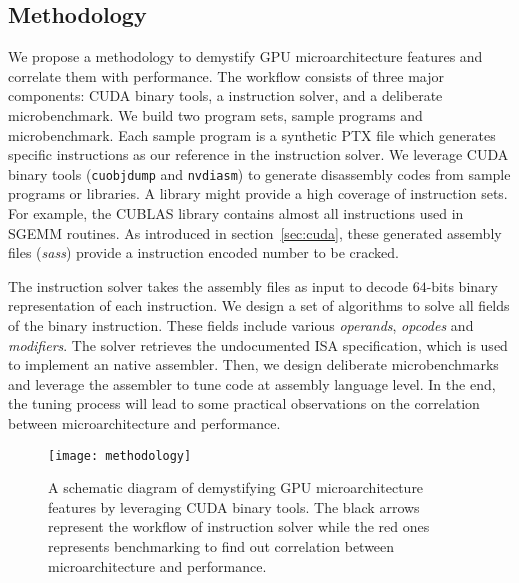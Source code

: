 \subsection{Methodology}

We propose a methodology to demystify GPU microarchitecture features and correlate them with performance. 
The workflow consists of three major components: CUDA binary tools, a instruction solver, and a deliberate microbenchmark. 
We build two program sets, sample programs and microbenchmark.
Each sample program is a synthetic PTX file which generates specific instructions as our reference in the instruction solver. 
We leverage CUDA binary tools ({\tt cuobjdump} and {\tt nvdiasm}) to generate disassembly codes from sample programs or libraries. 
A library might provide a high coverage of instruction sets. For example, the CUBLAS library contains almost all instructions used in SGEMM routines. As introduced in section~\ref{sec:cuda}, these generated assembly files ({\em sass}) provide a instruction encoded number to be cracked.

The instruction solver takes the assembly files as input to decode $64$-bits binary representation of each instruction. We design a set of algorithms to solve all fields of the binary instruction. These fields include various {\em operands}, {\em opcodes} and {\em modifiers}. The solver retrieves the undocumented ISA specification, which is used to implement an native assembler. Then, we design deliberate microbenchmarks and leverage the assembler to tune code at assembly language level. In the end, the tuning process will lead to some practical observations on the correlation between microarchitecture and performance.

\begin{figure}[htbp]
\begin{center}
\texttt{[image: methodology]}
\caption{A schematic diagram of demystifying GPU microarchitecture features by leveraging CUDA binary tools. The black arrows represent the workflow of instruction solver while the red ones represents benchmarking to find out correlation between microarchitecture and performance.}
\label{fig:workflow}
\end{center}
\end{figure}


